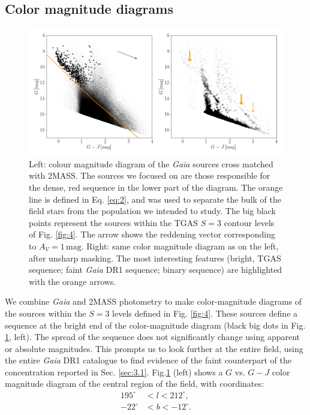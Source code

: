 \documentclass[twocolumn]{aa}
\begin{document}
\subsection{Color magnitude diagrams}\label{sec:3.2}
\begin{figure}
\includegraphics[width = \hsize]{fig7_new.png}
\caption{Left: colour magnitude diagram of the \textit{Gaia} sources cross matched with 2MASS. The sources we focused on are those responsible for the dense, red sequence in the lower part of the diagram. The orange line is defined in Eq. \eqref{eq:2}, and was used to separate the bulk of the field stars from the population we intended to study. The big black points represent the sources within the TGAS $S = 3$ contour levels of Fig. \ref{fig:4}. The arrow shows the reddening vector corresponding to $A_V = 1 \, \mathrm{mag}$. Right: same color magnitude diagram as on the left, after unsharp masking. The most interesting features (bright, TGAS sequence; faint \textit{Gaia} DR1 sequence; binary sequence) are highlighted with the orange arrows.}
\label{fig:6}
\end{figure}
We combine \textit{Gaia} and 2MASS photometry to make color-magnitude diagrams of the sources within the $S = 3$ levels defined in Fig. \ref{fig:4}. These sources define a sequence at the bright end of the color-magnitude diagram (black big dots in Fig. \ref{fig:6}, left). The spread of the sequence does not significantly change using apparent or absolute magnitudes. 
This prompts us to look further at the entire field, using the entire \textit{Gaia} DR1 catalogue to find evidence of the faint counterpart of the concentration reported in Sec. \ref{sec:3.1}. 
Fig.\ref{fig:6} (left) shows a $G$ vs. $G-J$ color magnitude diagram of the central region of the field, with coordinates:
\begin{align*}
195^{\circ} &< l < 212^{\circ}, \nonumber \\ 
-22^{\circ}  & < b < -12^{\circ}.
\end{align*}
\end{document}

